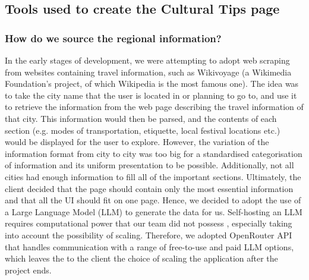 \subsection{Tools used to create the Cultural Tips page}

\subsubsection{How do we source the regional information?}

In the early stages of development, we were attempting to adopt web scraping from websites containing travel information, such as Wikivoyage (a Wikimedia Foundation's project, of which Wikipedia is the most famous one). The idea was to take the city name that the user is located in or planning to go to, and use it to retrieve the information from the web page describing the travel information of that city. This information would then be parsed, and the contents of each section (e.g. modes of transportation, etiquette, local festival locations etc.) would be displayed for the user to explore. However, the variation of the information format from city to city was too big for a standardised categorisation of information and its uniform presentation to be possible. Additionally, not all cities had enough information to fill all of the important sections. Ultimately, the client decided that the page should contain only the most essential information and that all the UI should fit on one page. Hence, we decided to adopt the use of a Large Language Model (LLM) to generate the data for us. Self-hosting an LLM requires computational power that our team did not possess \cite{selfHostedLLM}, especially taking into account the possibility of scaling. Therefore, we adopted OpenRouter API that handles communication with a range of free-to-use and paid LLM options, which leaves the to the client the choice of scaling the application after the project ends.

